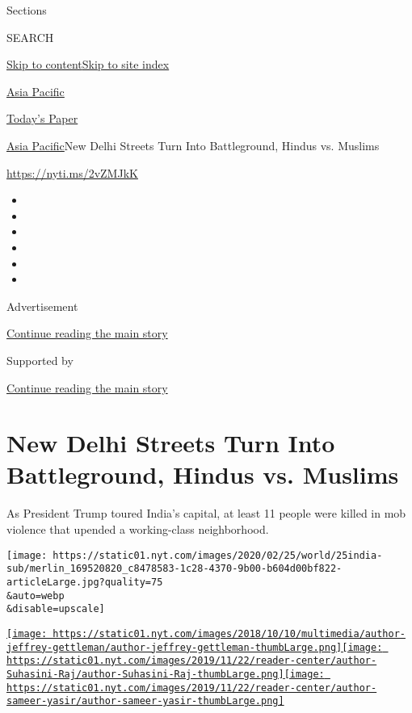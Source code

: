 Sections

SEARCH

\protect\hyperlink{site-content}{Skip to
content}\protect\hyperlink{site-index}{Skip to site index}

\href{https://www.nytimes.com/section/world/asia}{Asia Pacific}

\href{https://myaccount.nytimes.com/auth/login?response_type=cookie\&client_id=vi}{}

\href{https://www.nytimes.com/section/todayspaper}{Today's Paper}

\href{/section/world/asia}{Asia Pacific}\textbar{}New Delhi Streets Turn
Into Battleground, Hindus vs. Muslims

\url{https://nyti.ms/2vZMJkK}

\begin{itemize}
\item
\item
\item
\item
\item
\item
\end{itemize}

Advertisement

\protect\hyperlink{after-top}{Continue reading the main story}

Supported by

\protect\hyperlink{after-sponsor}{Continue reading the main story}

\hypertarget{new-delhi-streets-turn-into-battleground-hindus-vs-muslims}{%
\section{New Delhi Streets Turn Into Battleground, Hindus vs.
Muslims}\label{new-delhi-streets-turn-into-battleground-hindus-vs-muslims}}

As President Trump toured India's capital, at least 11 people were
killed in mob violence that upended a working-class neighborhood.

\texttt{[image: https://static01.nyt.com/images/2020/02/25/world/25india-sub/merlin\_169520820\_c8478583-1c28-4370-9b00-b604d00bf822-articleLarge.jpg?quality=75\\\&auto=webp\\\&disable=upscale]}

\href{https://www.nytimes.com/by/jeffrey-gettleman}{\texttt{[image: https://static01.nyt.com/images/2018/10/10/multimedia/author-jeffrey-gettleman/author-jeffrey-gettleman-thumbLarge.png]}}\href{https://www.nytimes.com/by/suhasini-raj}{\texttt{[image: https://static01.nyt.com/images/2019/11/22/reader-center/author-Suhasini-Raj/author-Suhasini-Raj-thumbLarge.png]}}\href{https://www.nytimes.com/by/sameer-yasir}{\texttt{[image: https://static01.nyt.com/images/2019/11/22/reader-center/author-sameer-yasir/author-sameer-yasir-thumbLarge.png]}}


